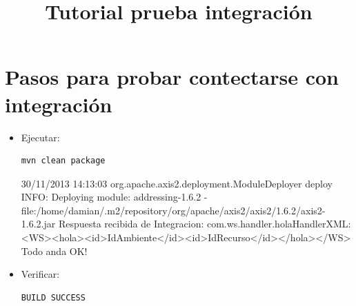 \documentclass[12pt]{article}
\title{Tutorial prueba integraci\'on}
\begin{document}
\maketitle
\clearpage
\section{Pasos para probar contectarse con integraci\'on}

\begin{itemize}
\item Ejecutar: %
\begin{verbatim}
mvn clean package
\end{verbatim}30/11/2013 14:13:03 org.apache.axis2.deployment.ModuleDeployer deploy
INFO: Deploying module: addressing-1.6.2 - file:/home/damian/.m2/repository/org/apache/axis2/axis2/1.6.2/axis2-1.6.2.jar
Respuesta recibida de Integracion:
com.ws.handler.holaHandlerXML: <WS><hola><id>IdAmbiente</id><id>IdRecurso</id></hola></WS>
Todo anda OK!

\begin{minipage}[t]{\linewidth}
          \raggedright

          \medskip
          
    \end{minipage}
\item Verificar: %
\begin{verbatim}
BUILD SUCCESS
\end{verbatim}
\begin{minipage}[t]{\linewidth}
          \raggedright


\end{minipage}
\end{itemize}
\end{document}

